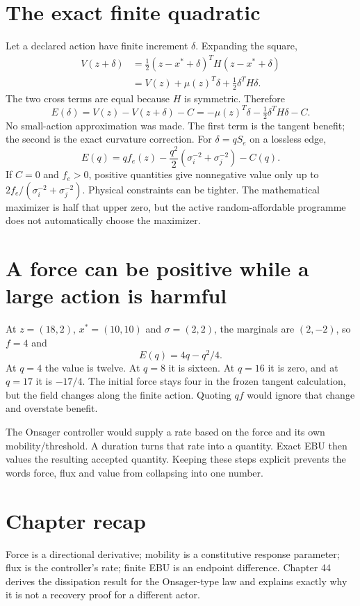 \section{The exact finite quadratic}
Let a declared action have finite increment $\delta$. Expanding the square,
\begin{align}
 V(z+\delta)
 &=\tfrac12(z-x^*+\delta)^TH(z-x^*+\delta)\\
 &=V(z)+\mu(z)^T\delta+\tfrac12\delta^TH\delta.
\end{align}
The two cross terms are equal because $H$ is symmetric. Therefore
\begin{equation}\label{eq:finite}
 E(\delta)=V(z)-V(z+\delta)-C
 =-\mu(z)^T\delta-\tfrac12\delta^TH\delta-C.
\end{equation}
No small-action approximation was made. The first term is the tangent
benefit; the second is the exact curvature correction. For $\delta=qS_e$
on a lossless edge,
\begin{equation}\label{eq:edgefinite}
 E(q)=qf_e(z)-\frac{q^2}{2}
       \left(\sigma_i^{-2}+\sigma_j^{-2}\right)-C(q).
\end{equation}
If $C=0$ and $f_e>0$, positive quantities give nonnegative value only up
to $2f_e/(\sigma_i^{-2}+\sigma_j^{-2})$. Physical constraints can be
tighter. The mathematical maximizer is half that upper zero, but the active
random-affordable programme does not automatically choose the maximizer.

\section{A force can be positive while a large action is harmful}
At $z=(18,2)$, $x^*=(10,10)$ and $\sigma=(2,2)$, the marginals are
$(2,-2)$, so $f=4$ and
\begin{equation}
 E(q)=4q-q^2/4.
\end{equation}
At $q=4$ the value is twelve. At $q=8$ it is sixteen. At $q=16$ it is
zero, and at $q=17$ it is $-17/4$. The initial force stays four in the
frozen tangent calculation, but the field changes along the finite action.
Quoting $qf$ would ignore that change and overstate benefit.

The Onsager controller would supply a rate based on the force and its own
mobility/threshold. A duration turns that rate into a quantity. Exact EBU
then values the resulting accepted quantity. Keeping these steps explicit
prevents the words force, flux and value from collapsing into one number.

\section*{Chapter recap}
Force is a directional derivative; mobility is a constitutive response
parameter; flux is the controller's rate; finite EBU is an endpoint
difference. Chapter 44 derives the dissipation result for the Onsager-type
law and explains exactly why it is not a recovery proof for a different actor.
